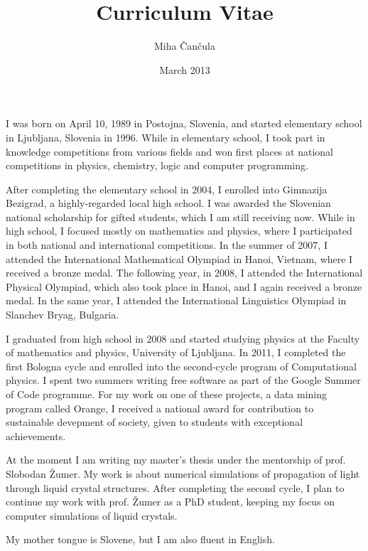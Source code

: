 \documentclass[a4paper]{article}
\title{Curriculum Vitae}
\author{Miha \v Can\v cula}
\date{March 2013}
\begin{document}
\maketitle

I was born on April 10, 1989 in Postojna, Slovenia, and started elementary school in Ljubljana, Slovenia in 1996. While in elementary school, I took part in knowledge competitions from various fields and won first places at national competitions in physics, chemistry, logic and computer programming. 

After completing the elementary school in 2004, I enrolled into Gimnazija Bezigrad, a highly-regarded local high school. I was awarded the Slovenian national scholarship for gifted students, which I am still receiving now. While in high school, I focused mostly on mathematics and physics, where I participated in both national and international competitions. In the summer of 2007, I attended the International Mathematical Olympiad in Hanoi, Vietnam, where I received a bronze medal. The following year, in 2008, I attended the International Physical Olympiad, which also took place in Hanoi, and I again received a bronze medal. In the same year, I attended the International Linguistics Olympiad in Slanchev Bryag, Bulgaria. 

I graduated from high school in 2008 and started studying physics at the Faculty of mathematics and physics, University of Ljubljana. In 2011, I completed the first Bologna cycle and enrolled into the second-cycle program of Computational physics. I spent two summers writing free software as part of the Google Summer of Code programme. For my work on one of these projects, a data mining program called Orange, I received a national award for contribution to sustainable devepment of society, given to students with exceptional achievements. 

At the moment I am writing my master's thesis under the mentorship of prof. Slobodan Žumer. My work is about numerical simulations of propagation of light through liquid crystal structures. After completing the second cycle, I plan to continue my work with prof. Žumer as a PhD student, keeping my focus on computer simulations of liquid crystals. 

My mother tongue is Slovene, but I am also fluent in English. 
\end{document}
